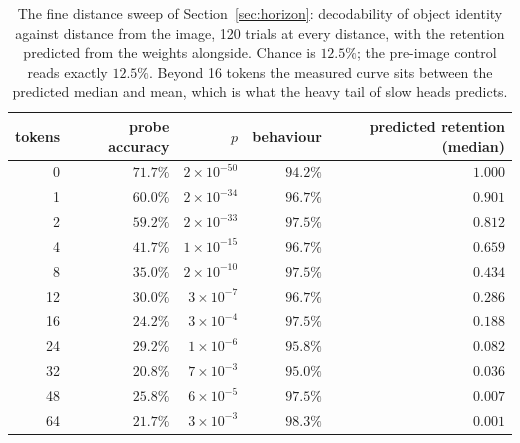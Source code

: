 \begin{table}[h]
\centering\small
\begin{tabular}{rrrrr}
\toprule
tokens & probe accuracy & $p$ & behaviour & predicted retention (median) \\
\midrule
0  & $71.7\%$ & $2\times10^{-50}$ & $94.2\%$ & $1.000$ \\
1  & $60.0\%$ & $2\times10^{-34}$ & $96.7\%$ & $0.901$ \\
2  & $59.2\%$ & $2\times10^{-33}$ & $97.5\%$ & $0.812$ \\
4  & $41.7\%$ & $1\times10^{-15}$ & $96.7\%$ & $0.659$ \\
8  & $35.0\%$ & $2\times10^{-10}$ & $97.5\%$ & $0.434$ \\
12 & $30.0\%$ & $3\times10^{-7}$  & $96.7\%$ & $0.286$ \\
16 & $24.2\%$ & $3\times10^{-4}$  & $97.5\%$ & $0.188$ \\
24 & $29.2\%$ & $1\times10^{-6}$  & $95.8\%$ & $0.082$ \\
32 & $20.8\%$ & $7\times10^{-3}$  & $95.0\%$ & $0.036$ \\
48 & $25.8\%$ & $6\times10^{-5}$  & $97.5\%$ & $0.007$ \\
64 & $21.7\%$ & $3\times10^{-3}$  & $98.3\%$ & $0.001$ \\
\bottomrule
\end{tabular}
\caption{The fine distance sweep of Section~\ref{sec:horizon}: decodability of
object identity against distance from the image, 120 trials at every distance,
with the retention predicted from the weights alongside. Chance is $12.5\%$; the
pre-image control reads exactly $12.5\%$. Beyond 16 tokens the measured curve
sits between the predicted median and mean, which is what the heavy tail of slow
heads predicts.}
\label{tab:fine}
\end{table}

